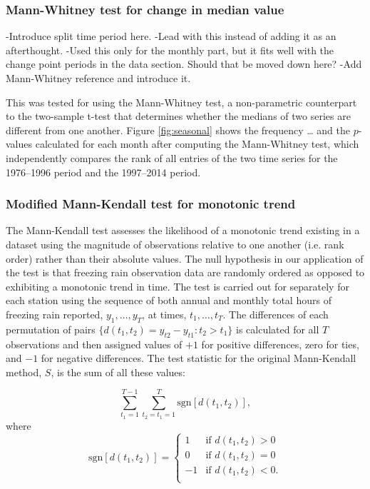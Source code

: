 \documentclass[twocol]{ametsoc}
\begin{document}
\subsubsection{Mann-Whitney test for change in median value}
-Introduce split time period here.
-Lead with this instead of adding it as an afterthought.
-Used this only for the monthly part, but it fits well with the change point periods in the data section. Should that be moved down here?
-Add Mann-Whitney reference and introduce it.

This was tested for using the Mann-Whitney test, a non-parametric counterpart to the two-sample t-test that determines whether the medians of two series are different from one another. Figure \ref{fig:seasonal} shows the frequency … and the $p$-values calculated for each month after computing the Mann-Whitney test, which independently compares the rank of all entries of the two time series for the 1976--1996 period and the 1997--2014 period.


\subsubsection{Modified Mann-Kendall test for monotonic trend}
The Mann-Kendall test assesses the likelihood of a monotonic trend existing in a dataset using the magnitude of observations relative to one another (i.e. rank order) rather than their absolute values. The null hypothesis in our application of the test is that freezing rain observation data are randomly ordered as opposed to exhibiting a monotonic trend in time. The test is carried out for separately for each station using the sequence of both annual and monthly total hours of freezing rain reported, $y_1,\ldots,y_T$, at times, $t_1,\ldots,t_T$. The differences of each permutation of pairs $\{d(t_1,t_2)=y_{t2}-y_{t1}:t_2>t_1\}$ is calculated for all $T$ observations and then assigned values of $+1$ for positive differences, zero for ties, and $-1$ for negative differences. The test statistic for the original Mann-Kendall method, $S$, is the sum of all these values:

\[\sum_{t_1=1}^{T-1}\sum_{t_2=t_1=1}^T\text{sgn}[d(t_1,t_2)],\] where\\

\[\text{sgn}[d(t_1,t_2)]=\begin{cases} 1 & \text{if } d(t_1,t_2)>0\\ 0 & \text{if } d(t_1,t_2)=0\\ -1 & \text{if } d(t_1,t_2)<0.\\ \end{cases}\]
\end{document}
